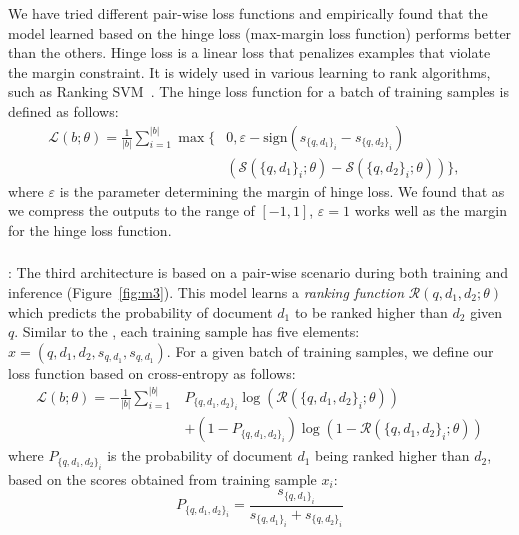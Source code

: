 We have tried different pair-wise loss functions and empirically found that the model learned based on the hinge loss (max-margin loss function) performs better than the others. 
Hinge loss is a linear loss that penalizes examples that violate the margin constraint. It is widely used in various learning to rank algorithms, such as Ranking SVM~\citep{Herbrich:1999}. The hinge loss function for a batch of training samples is defined as follows:
\begin{equation}
\begin{aligned}
\mathcal{L}(b; \theta) = \frac{1}{|b|}
\sum_{i=1}^{|b|}
\max\big\{
& 
0, \varepsilon - \text{sign}
(s_{\{q, d_1\}_i} - s_{\{q, d_2\}_i})
& \\ & 
\left(\mathcal{S}\left(\{q, d_1\}_i; \theta\right) -\mathcal{S}\left(\{q, d_2\}_i; \theta\right)\right)
\big\}
, 
\end{aligned}     
\end{equation}
where $\varepsilon$ is the parameter determining the margin of hinge loss. We found that as we compress the outputs to the range of $[-1, 1]$, $\varepsilon=1$ works well as the margin for the hinge loss function.

\subsubsection{\label{sec:modelthree}\Modelthree}:
The third architecture is based on a pair-wise scenario during both training and inference (Figure~\ref{fig:m3}). This model learns a \emph{ranking function} $\mathcal{R}(q, d_1, d_2; \theta)$ which predicts the probability of document $d_1$ to be ranked higher than $d_2$ given $q$.
Similar to the \modeltwo, each training sample has five elements: $x = (q,d_1, d_2, s_{q,d_1}, s_{q,d_1})$.
For a given batch of training samples, we define our loss function based on cross-entropy as follows:
\begin{align}
\mathcal{L}(b; \theta) = -\frac{1}{|b|}
\sum_{i=1}^{|b|} &
P_{\{q,d_1,d_2\}_i} \log(\mathcal{R}(\{q,d_1,d_2\}_i; \theta)) \\
&
+ (1- P_{\{q,d_1,d_2\}_i})\log(1- \mathcal{R}(\{q,d_1,d_2\}_i; \theta)) \nonumber
\end{align}
where $P_{\{q,d_1,d_2\}_i}$ is the probability of document $d_1$ being ranked higher than $d_2$, based on the scores obtained from training sample $x_i$:
\begin{equation}
P_{\{q,d_1,d_2\}_i} = \frac{s_{\{q,d_1\}_i}}{s_{\{q,d_1\}_i} + s_{\{q,d_2\}_i}}
\end{equation}

